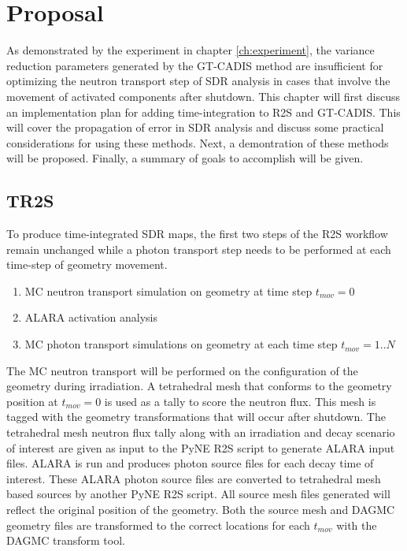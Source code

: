 \chapter{Proposal}\label{ch:proposal}

As demonstrated by the experiment in chapter \ref{ch:experiment},  the variance
reduction parameters generated by the GT-CADIS method are insufficient for
optimizing the neutron transport step of SDR analysis in cases that involve the movement 
of activated components after shutdown.  
This chapter will first discuss an implementation plan for adding
time-integration to R2S and GT-CADIS.  This will cover the propagation of error
in SDR analysis and discuss some practical considerations for
using these methods. 
Next, a demontration of these methods will be proposed.
Finally, a summary of goals to accomplish will be given.

\section{TR2S}\label{sec:tr2s}
To produce time-integrated SDR maps, the
first two steps of the R2S workflow remain unchanged
while a photon transport step needs to be performed at each time-step of
geometry movement.
\begin{enumerate}
	\item{MC neutron transport simulation on geometry at time step $t_{mov}=0$}
	\item{ALARA activation analysis} 
	\item{MC photon transport simulations on geometry at each time step $t_{mov}=1..N$}
\end{enumerate}
The MC neutron transport will be performed on the configuration of the geometry 
during irradiation.
A tetrahedral mesh that conforms to
the geometry position at $t_{mov}=0$ is used as a tally to score the neutron flux.
This mesh is tagged with the geometry transformations that will occur after
shutdown.  The tetrahedral mesh neutron flux tally along with an irradiation and decay
scenario of interest are given as input to the PyNE R2S
script to generate ALARA input files.  ALARA is run and produces photon source
files for each decay time of interest.  These ALARA photon source files are
converted to tetrahedral mesh based sources by another PyNE R2S script.  All
source mesh files generated will reflect the original position of the geometry.
Both the source mesh and DAGMC geometry files are transformed to the 
correct locations for each $t_{mov}$ with the DAGMC transform tool.

